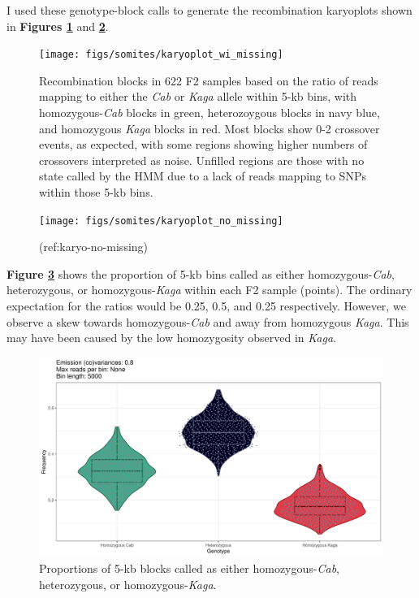 \documentclass[
]{book}
\begin{document}
I used these genotype-block calls to generate the recombination karyoplots shown in \textbf{Figures \ref{fig:karyo-wi-missing}} and \textbf{\ref{fig:karyo-no-missing}}.



\begin{figure}
\texttt{[image: figs/somites/karyoplot\_wi\_missing]} \caption{Recombination blocks in 622 F2 samples based on the ratio of reads mapping to either the \emph{Cab} or \emph{Kaga} allele within 5-kb bins, with homozygous-\emph{Cab} blocks in green, heterozoygous blocks in navy blue, and homozygous \emph{Kaga} blocks in red. Most blocks show 0-2 crossover events, as expected, with some regions showing higher numbers of crossovers interpreted as noise. Unfilled regions are those with no state called by the HMM due to a lack of reads mapping to SNPs within those 5-kb bins.}\label{fig:karyo-wi-missing}
\end{figure}

\begin{figure}
\texttt{[image: figs/somites/karyoplot\_no\_missing]} \caption{(ref:karyo-no-missing)}\label{fig:karyo-no-missing}
\end{figure}

\textbf{Figure \ref{fig:prop-sites-total}} shows the proportion of 5-kb bins called as either homozygous-\emph{Cab}, heterozygous, or homozygous-\emph{Kaga} within each F2 sample (points). The ordinary expectation for the ratios would be 0.25, 0.5, and 0.25 respectively. However, we observe a skew towards homozygous-\emph{Cab} and away from homozygous \emph{Kaga}. This may have been caused by the low homozygosity observed in \emph{Kaga}.



\begin{figure}
\includegraphics[width=1\linewidth]{figs/somites/prop_sites_total} \caption{Proportions of 5-kb blocks called as either homozygous-\emph{Cab}, heterozygous, or homozygous-\emph{Kaga}.}\label{fig:prop-sites-total}
\end{figure}
\end{document}

